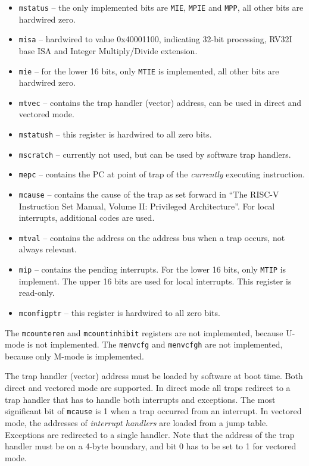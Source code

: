 \documentclass[12pt]{article}
\begin{document}
\begin{itemize}
\item \texttt{mstatus} -- the only implemented bits are \texttt{MIE}, \texttt{MPIE} and \texttt{MPP}, all other bits are hardwired zero.
\item \texttt{misa} -- hardwired to value 0x40001100, indicating 32-bit processing, RV32I base ISA and Integer Multiply/Divide extension.
\item \texttt{mie} -- for the lower 16 bits, only \texttt{MTIE} is implemented, all other bits are hardwired zero.
\item \texttt{mtvec} -- contains the trap handler (vector) address, can be used in direct and vectored mode.
\item \texttt{mstatush} -- this register is hardwired to all zero bits.
\item \texttt{mscratch} -- currently not used, but can be used by software trap handlers.
\item \texttt{mepc} -- contains the PC at point of trap of the \emph{currently} executing instruction.
\item \texttt{mcause} -- contains the cause of the trap as set forward in ``The RISC-V Instruction Set Manual, Volume II: Privileged Architecture''. For local interrupts, additional codes are used.
\item \texttt{mtval} -- contains the address on the address bus when a trap occurs, not always relevant.
\item \texttt{mip} -- contains the pending interrupts. For the lower 16 bits, only \texttt{MTIP} is implement. The upper 16 bits are used for local interrupts. This register is read-only.
\item \texttt{mconfigptr} -- this register is hardwired to all zero bits.
\end{itemize}

The \texttt{mcounteren} and \texttt{mcountinhibit} registers are not implemented, because U-mode is not implemented. The \texttt{menvcfg} and \texttt{menvcfgh} are not implemented, because only M-mode is implemented.

The trap handler (vector) address must be loaded by software at boot time. Both direct and vectored mode are supported. In direct mode all traps redirect to a trap handler that has to handle both interrupts and exceptions. The most significant bit of \texttt{mcause} is 1 when a trap occurred from an interrupt. In vectored mode, the addresses of \emph{interrupt handlers} are loaded from a jump table. Exceptions are redirected to a single handler. Note that the address of the trap handler must be on a 4-byte boundary, and bit 0 has to be set to 1 for vectored mode.
\end{document}
